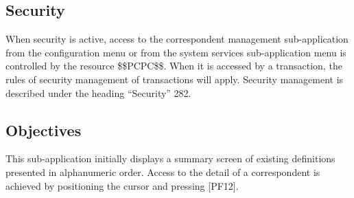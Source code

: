\documentclass[letterpaper,10pt,english]{sphinxmanual}
\begin{document}
\ignorespaces 

\subsection{Security}
\label{\detokenize{audit_operations_ and_performance:security}}\label{\detokenize{audit_operations_ and_performance:index-50}}
When security is active, access to the correspondent management sub-application from the configuration menu or
from the system services sub-application menu is controlled by the resource \$\$PCPC\$\$.
When it is accessed by a transaction, the rules of security management of transactions will apply.
Security management is described under the heading “Security” 282.

\ignorespaces 

\subsection{Objectives}
\label{\detokenize{audit_operations_ and_performance:objectives}}\label{\detokenize{audit_operations_ and_performance:index-51}}
This sub-application initially displays a summary screen of existing definitions presented in alphanumeric order. Access
to the detail of a correspondent is achieved by positioning the cursor and pressing {[}PF12{]}.



\end{document}
